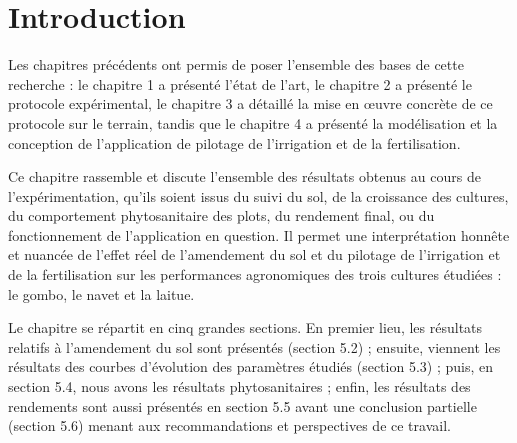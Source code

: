 \section{Introduction}
Les chapitres précédents ont permis de poser l'ensemble des bases de cette recherche : le chapitre 1 a présenté l'état de l'art, 
le chapitre 2 a présenté le protocole expérimental, le chapitre 3 a détaillé la mise en œuvre concrète de ce protocole sur le terrain, tandis que le chapitre 4 a présenté la modélisation et la conception de l'application de pilotage de l'irrigation et de la fertilisation.

Ce chapitre  rassemble et discute l'ensemble des résultats obtenus au cours de l'expérimentation, qu'ils soient issus du suivi du sol, 
de la croissance des cultures, du comportement phytosanitaire des plots, du rendement final, ou du fonctionnement de l'application en question. 
Il permet une interprétation honnête et nuancée de l'effet réel de l'amendement du sol et du pilotage de l'irrigation et de la fertilisation sur les performances agronomiques des trois cultures étudiées : le gombo, le navet et la laitue.

Le chapitre se répartit  en cinq grandes sections. En premier lieu, les résultats relatifs à l'amendement du sol sont présentés (section 5.2) ; ensuite, viennent les résultats des courbes d'évolution des paramètres étudiés (section 5.3) ; 
puis, en section 5.4, nous avons les résultats phytosanitaires ; enfin, les résultats des rendements sont aussi présentés en section 5.5 avant une conclusion partielle (section 5.6) menant aux recommandations et perspectives de ce travail.
